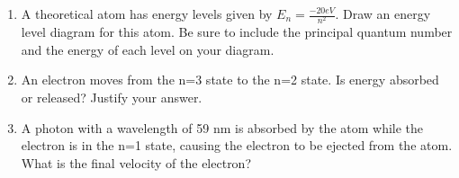 \documentclass[12pt]{examdesign}
\begin{document}
\begin{shortanswer}[title={Free Response}, rearrange=no]
	\begin{question}

\begin{enumerate}
	\item A theoretical atom has energy levels given by $E_n = \frac{-20 eV}{n^2}$. Draw an energy level diagram for this atom.  Be sure to include the principal quantum number and the energy of each level on your diagram.
	\vspace {2in}
	\item An electron moves from the n=3 state to the n=2 state.  Is energy absorbed or released?  Justify your answer.  
	\vspace{1in}
	\item A photon with a wavelength of 59 nm is absorbed by the atom while the electron is in the n=1 state, causing the electron to be ejected from the atom.  What is the final velocity of the electron?
\end{enumerate}
	\end{question}
	
	
	
	
\end{shortanswer}
\end{document}
